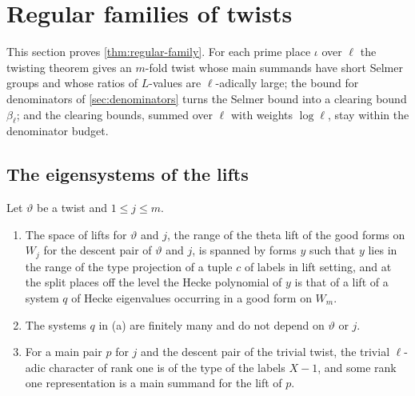 \section{Regular families of twists}\label{sec:fit}

This section proves \cref{thm:regular-family}. For each prime place $\iota$ over $\ell$ the twisting theorem gives an $m$-fold twist whose main summands have short Selmer groups and whose ratios of
$L$-values are $\ell$-adically large; the bound for denominators of \cref{sec:denominators} turns the Selmer bound into a clearing bound $\beta_\ell$; and the clearing bounds,
summed over $\ell$ with weights $\log\ell$, stay within the denominator budget.

\subsection{The eigensystems of the lifts}\label{ss:fit-eigensystems}

\begin{proposition}\label{prop:fit-splitting}
Let $\vartheta$ be a twist and $1\le j\le m$.
\begin{enumerate}[label=\textup{(\alph*)}]
\item The space of lifts for $\vartheta$ and $j$, the range of the theta lift of the good forms on $W_j$ for the descent pair of $\vartheta$ and $j$, is spanned by forms $y$ such that $y$ lies in the range of the type projection of a
tuple $c$ of labels in lift setting, and at the split places off the level the Hecke polynomial of $y$ is that of a lift of a system $q$ of Hecke eigenvalues occurring in a good form on $W_m$.
\item The systems $q$ in (a) are finitely many and do not depend on $\vartheta$ or $j$.
\item For a main pair $p$ for $j$ and the descent pair of the trivial twist, the trivial $\ell$-adic character of rank one is of the type of the labels $X-1$, and some rank one representation is a main summand
for the lift of $p$.
\end{enumerate}
\end{proposition}

